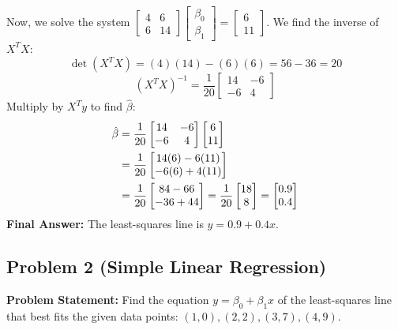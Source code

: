 \documentclass[11pt, letterpaper]{article}
\theoremstyle{definition}
\theoremstyle{remark}
\begin{document}
Now, we solve the system $\begin{bmatrix} 4 & 6 \\ 6 & 14 \end{bmatrix} \begin{bmatrix} \beta_0 \\ \beta_1 \end{bmatrix} = \begin{bmatrix} 6 \\ 11 \end{bmatrix}$. We find the inverse of $X^T X$:
\[
\det(X^T X) = (4)(14) - (6)(6) = 56 - 36 = 20
\]
\[
(X^T X)^{-1} = \frac{1}{20} \begin{bmatrix} 14 & -6 \\ -6 & 4 \end{bmatrix}
\]
Multiply by $X^T y$ to find $\hat{\beta}$:
\begin{align*}
\hat{\beta} &= \frac{1}{20} \begin{bmatrix} 14 & -6 \\ -6 & 4 \end{bmatrix} \begin{bmatrix} 6 \\ 11 \end{bmatrix} \\ \relax
&= \frac{1}{20} \begin{bmatrix} 14(6) - 6(11) \\ -6(6) + 4(11) \end{bmatrix} \\ \relax
&= \frac{1}{20} \begin{bmatrix} 84 - 66 \\ -36 + 44 \end{bmatrix} = \frac{1}{20} \begin{bmatrix} 18 \\ 8 \end{bmatrix} = \begin{bmatrix} 0.9 \\ 0.4 \end{bmatrix}
\end{align*}
\textbf{Final Answer:} The least-squares line is $\displaystyle y = 0.9 + 0.4x$.

\subsection*{Problem 2 (Simple Linear Regression)}
\textbf{Problem Statement:} Find the equation $y = \beta_0 + \beta_1 x$ of the least-squares line that best fits the given data points: $(1, 0), (2, 2), (3, 7), (4, 9)$.
\end{document}
